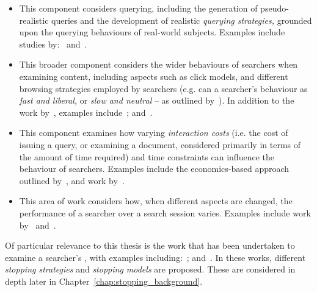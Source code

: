 \begin{itemize}
    \item{ This component considers querying, including the generation of pseudo-realistic queries and the development of realistic \emph{querying strategies,} grounded upon the querying behaviours of real-world subjects. Examples include studies by:~\cite{azzopardi2009query_side, azzopardi2007languages, carterette2015test_collections, jordan2006cqg, keskustalo2009querying} and~\cite{verberne2015personalised_queries}.}
    
    \item{ This broader component considers the wider behaviours of searchers when examining content, including aspects such as click models, and different browsing strategies employed by searchers (e.g. can a searcher's behaviour as \emph{fast and liberal,} or \emph{slow and neutral} -- as outlined by~\cite{smucker2011user_strategies}). In addition to the work by~\cite{smucker2011user_strategies}, examples include~\cite{carterette2015test_collections, chuklin2015click_models, guo2009click_chain}; and~\cite{pakkonen2015behavioural_dimensions}.}
    
    \item{ This component examines how varying \emph{interaction costs} (i.e. the cost of issuing a query, or examining a document, considered primarily in terms of the amount of time required) and time constraints can influence the behaviour of searchers. Examples include the economics-based approach outlined by~\cite{azzopardi2011economics}, and work by~\cite{baskaya2012simulating_sessions}.}
    
    \item{ This area of work considers how, when different aspects are changed, the performance of a searcher over a search session varies. Examples include work by~\cite{luo2014winwin} and~\cite{luo2015pomdp}.}
\end{itemize}

Of particular relevance to this thesis is the work that has been undertaken to examine a searcher's , with examples including:~\cite{carterette2015test_collections, maxwell2015initial_stopping, maxwell2015stopping_strategies}; and~\cite{thomas2014modelling_behaviour}. In these works, different \emph{stopping strategies} and \emph{stopping models} are proposed. These are considered in depth later in Chapter~\ref{chap:stopping_background}.

